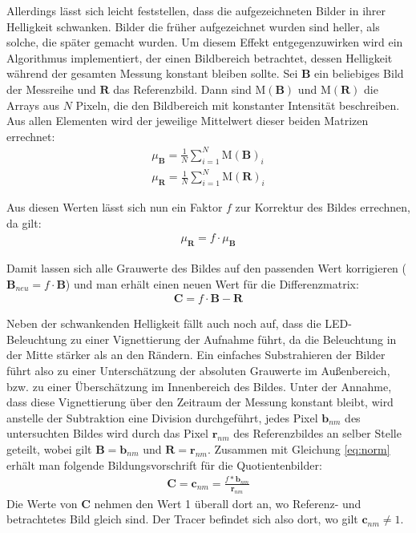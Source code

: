 Allerdings lässt sich leicht feststellen, dass die aufgezeichneten Bilder in ihrer Helligkeit schwanken. Bilder die früher aufgezeichnet wurden sind heller, als 
solche, die später gemacht wurden. Um diesem Effekt entgegenzuwirken wird ein Algorithmus implementiert, der einen Bildbereich betrachtet, dessen Helligkeit 
während der gesamten Messung konstant bleiben sollte. Sei $\mathbf{B}$ ein beliebiges Bild der Messreihe und $\mathbf{R}$ das Referenzbild. Dann sind 
$\mathrm{M(\mathbf{B})}$ und $\mathrm{M(\mathbf{R})}$ die Arrays aus $N$ Pixeln, die den Bildbereich mit konstanter Intensität beschreiben. Aus allen Elementen 
wird der jeweilige Mittelwert dieser beiden Matrizen errechnet:
\begin{eqnarray}
 \mu_{\mathbf{B}} = \frac{1}{N} \sum_{i=1}^N \mathrm{M(\mathbf{B})}_i \\
 \mu_{\mathbf{R}} = \frac{1}{N} \sum_{i=1}^N \mathrm{M(\mathbf{R})}_i
\end{eqnarray}

Aus diesen Werten lässt sich nun ein Faktor $f$ zur Korrektur des Bildes errechnen, da gilt:
\begin{eqnarray}
 \mu_{\mathbf{R}} = f \cdot \mu_{\mathbf{B}}
\end{eqnarray}

Damit lassen sich alle Grauwerte des Bildes auf den passenden Wert korrigieren ($\mathbf{B}_{neu} = f \cdot \mathbf{B}$) und man erhält einen neuen Wert für die 
Differenzmatrix:
\begin{eqnarray}
 \mathbf{C} = f \cdot \mathbf{B} - \mathbf{R}
 \label{eq:norm}
\end{eqnarray}


Neben der schwankenden Helligkeit fällt auch noch auf, dass die LED-Beleuchtung zu einer Vignettierung der Aufnahme führt, da die Beleuchtung in der Mitte 
stärker als an den Rändern. Ein einfaches Substrahieren der Bilder führt also zu einer Unterschätzung der absoluten Grauwerte im Außenbereich, bzw. zu einer 
Überschätzung im Innenbereich des Bildes.
Unter der Annahme, dass diese Vignettierung über den Zeitraum der Messung konstant bleibt, wird anstelle der Subtraktion eine Division durchgeführt, \dah jedes 
Pixel $\mathbf{b}_{nm}$ des untersuchten Bildes wird durch das Pixel $\mathbf{r}_{nm}$ des Referenzbildes an selber Stelle geteilt, wobei gilt 
$\mathbf{B} = \mathbf{b}_{nm}$ und $\mathbf{R} = \mathbf{r}_{nm}$. Zusammen mit Gleichung \ref{eq:norm} erhält man folgende Bildungsvorschrift für die 
Quotientenbilder:
\begin{eqnarray}
 \mathbf{C} = \mathbf{c}_{nm} = \frac{f * \mathbf{b}_{nm}}{\mathbf{r}_{nm}}
 \label{eq:quot}
\end{eqnarray}
Die Werte von $\mathbf{C}$ nehmen den Wert 1 überall dort an, wo Referenz- und betrachtetes Bild gleich sind. Der Tracer befindet sich also dort, wo gilt 
$\mathbf{c}_{nm} \neq 1$.

